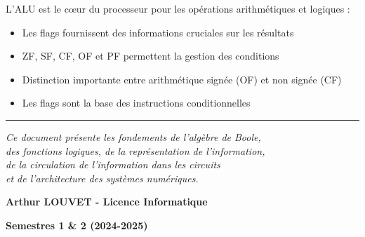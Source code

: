 \documentclass[a4paper,12pt]{article}
\begin{document}
L'ALU est le cœur du processeur pour les opérations arithmétiques et logiques :
\begin{itemize}
    \item Les flags fournissent des informations cruciales sur les résultats
    \item ZF, SF, CF, OF et PF permettent la gestion des conditions
    \item Distinction importante entre arithmétique signée (OF) et non signée (CF)
    \item Les flags sont la base des instructions conditionnelles
\end{itemize}

\vspace{2cm}

\begin{center}
\rule{10cm}{0.5pt}

\vspace{0.5cm}

\textit{Ce document présente les fondements de l'algèbre de Boole, \\
des fonctions logiques, de la représentation de l'information, \\
de la circulation de l'information dans les circuits \\
et de l'architecture des systèmes numériques.}

\vspace{0.5cm}

\textbf{Arthur LOUVET - Licence Informatique}

\textbf{Semestres 1 \& 2 (2024-2025)}
\end{center}
\end{document}
